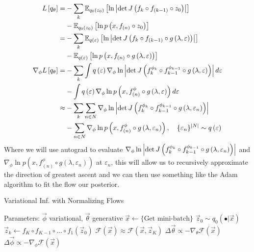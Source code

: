 \begin{align*}
     L\left[q_\theta\right] = & -\sum_k\mathbb{E}_{q_0\left(z_0\right)}\left[\ln\left\lvert\det J\left(f_k \circ f_{\left(k-1\right)}\circ z_0\right)\right\rvert\right] 
     \\&-\mathbb{E}_{q_0\left(z_0\right)}\left[\ln p\left(x,f_{\left(n\right)}\circ z_0\right)\right]\\
     = & -\sum_k\mathbb{E}_{q\left(\varepsilon\right)}\left[\ln\left\lvert\det J\left(f_k \circ f_{\left(k-1\right)}\circ g\left(\lambda,\varepsilon\right)\right)\right\rvert\right] 
     \\&-\mathbb{E}_{q\left(\varepsilon\right)}\left[\ln p\left(x,f_{\left(n\right)}\circ g\left(\lambda,\varepsilon\right)\right)\right]\\
    \nabla_\phi L\left[q_\theta\right] = & -\sum_k\int q\left(\varepsilon\right)\nabla_\phi \ln\left\lvert\det J\left(f^{\phi_k}_k \circ f^{\phi_{k-1}}_{k-1}\circ g\left(\lambda,\varepsilon\right)\right)\right\rvert d\varepsilon \\ & -\int q\left(\varepsilon\right)\nabla_\phi \ln p\left(x,f^\phi_{\left(n\right)}\circ g\left(\lambda,\varepsilon\right)\right)d\varepsilon\\
     \approx & -\sum_k\sum_{n\in N}\nabla_\phi \ln\left\lvert\det J\left(f^{\phi_k}_k \circ f^{\phi_{k-1}}_{k-1}\circ g\left(\lambda,\varepsilon_n\right)\right)\right\rvert \\ 
     & -\sum_{n \in N}\nabla_\phi \ln p\left(x,f^\phi_{\left(n\right)}\circ g\left(\lambda,\varepsilon_n\right)\right), \quad \{\varepsilon_n\}^{\left\lvert N\right\rvert} \sim q\left(\varepsilon\right)
\end{align*}
Where we will use autograd to evaluate $\nabla_\phi \ln\left\lvert\det J\left(f^{\phi_k}_k \circ f^{\phi_{k-1}}_{k-1}\circ g\left(\lambda,\varepsilon_n\right)\right)\right\rvert$ and $\nabla_\phi \ln p\left(x,f^\phi_{\left(n\right)}\circ g\left(\lambda,\varepsilon_n\right)\right)$ at $\varepsilon_n$, this will allow us to recursively approximate the direction of greatest ascent and we can then use something like the Adam algorithm to fit the flow our posterior.

\begin{algorithm}
\caption{Variational Inf. with Normalizing Flows}\label{alg:vinf}
\begin{algorithmic}
\State Parameters: $\Vec\phi$ variational, $\Vec\theta$ generative
    \State $\Vec x \gets \{ \text{Get mini-batch} \}$
    \State $\Vec z_0 \sim q_0\left(\bullet |\Vec x\right)$
    \State $\Vec z_k \gets f_K \circ f_{K-1} \circ \ldots \circ f_1 \left(\Vec z_0\right)$
    \State $\mathcal{F}\left(\Vec x\right) \approx \mathcal{F}\left(\Vec x, \Vec z_K\right)$
    \State $\Delta \Vec \theta \propto - \nabla_\theta \mathcal{F}\left(\Vec x\right)$
    \State $\Delta \Vec \phi \propto - \nabla_\phi \mathcal{F}\left(\Vec x\right)$
\EndWhile
\end{algorithmic}
\end{algorithm}

